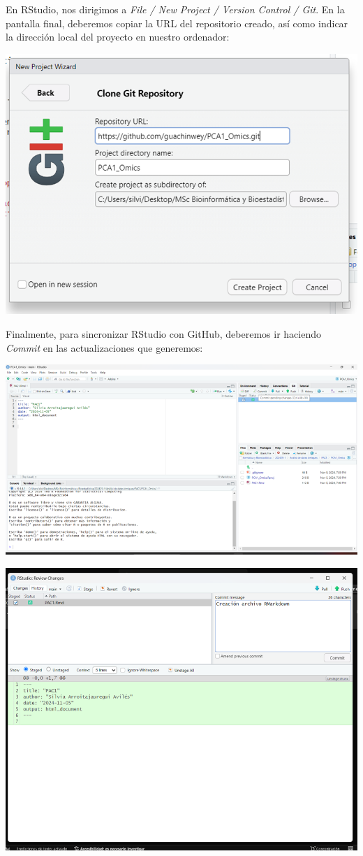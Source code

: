 \documentclass[
]{article}
\begin{document}
En RStudio, nos dirigimos a \emph{File / New Project / Version Control /
Git}. En la pantalla final, deberemos copiar la URL del repositorio
creado, así como indicar la dirección local del proyecto en nuestro
ordenador:

\includegraphics{images/clipboard-4094692892.png}

Finalmente, para sincronizar RStudio con GitHub, deberemos ir haciendo
\emph{Commit} en las actualizaciones que generemos:

\includegraphics{images/clipboard-30791053.png}

\includegraphics{images/clipboard-2508258357.png}
\end{document}
